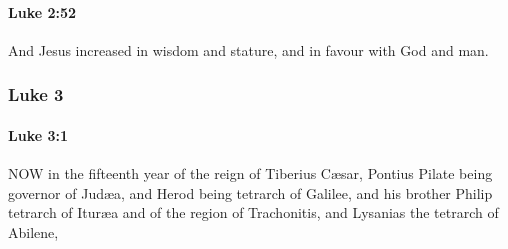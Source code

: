 		\paragraph{Luke 2:52} %
			\label{LUKE-2-52}

			And Jesus increased in wisdom and stature, and in favour with God and man.

			\begin{framed}
			\scriptsize
				\begin{compactdesc}
					\item[SBLG] 
				\end{compactdesc}
			\end{framed}

	\subsubsection{Luke 3} %
		\label{LUKE-3}
		
		\paragraph{Luke 3:1} %
			\label{LUKE-3-1}

			NOW in the fifteenth year of the reign of Tiberius Cæsar, Pontius Pilate being governor of Judæa, and Herod being tetrarch of Galilee, and his brother Philip tetrarch of Ituræa and of the region of Trachonitis, and Lysanias the tetrarch of Abilene,

